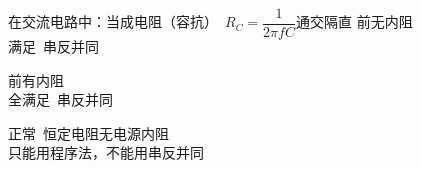 \noindent 在交流电路中：当成电阻（容抗）\ $R_C=\dfrac{1}{2\pi fC}$\quad 通交隔直
\noindent 前无内阻\\
满足\ 串反并同%

\noindent 前有内阻\\
全满足\ 串反并同

\noindent 正常\ 恒定电阻无电源内阻\\
只能用程序法，不能用串反并同

